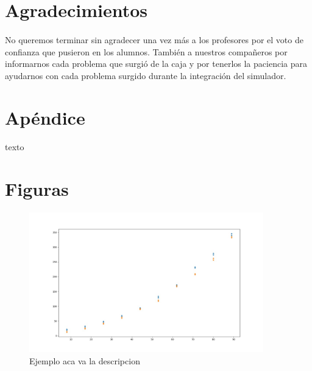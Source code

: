 \documentclass{article}
\begin{document}
\section{Agradecimientos}

\paragraph{}
No queremos terminar sin agradecer una vez más a los profesores por el voto de confianza que pusieron en los alumnos. También a nuestros compañeros por informarnos cada problema que surgió de la caja y por tenerlos la paciencia para ayudarnos con cada problema surgido durante la integración del simulador.

\section{Apéndice}

\paragraph{}
texto

\clearpage

\section{Figuras}
\begin{figure}[h]
\begin{center}
\includegraphics[width=4in]{./images/inputVsOutput.jpeg}
\caption{Ejemplo aca va la descripcion }
\label{grafico}
\end{center}
\end{figure}
\end{document}
